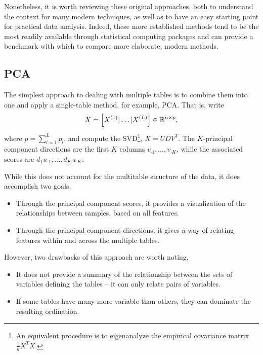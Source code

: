 \documentclass{article}
\begin{document}
Nonetheless, it is worth reviewing these original approaches, both to
understand the context for many modern techniques, as well as to have
an easy starting point for practical data analysis. Indeed, these more
established methods tend to be the most readily available through
statistical computing packages and can provide a benchmark with which
to compare more elaborate, modern methods.

\subsection{PCA}
\label{sec:pca}

The simplest approach to dealing with multiple tables is to combine
them into one and apply a single-table method, for example, PCA. That
is, write
\begin{align}
X = \left[X^{(1)} \vert \dots \vert X^{(L)}\right] \in \mathbb{R}^{n \times p},
\end{align}
where $p = \sum_{l = 1}^{L}p_{l}$, and compute the SVD\footnote{An
  equivalent procedure is to eigenanalyze the empirical covariance
  matrix $\frac{1}{n}X^{T}X$.}, $X = UDV^{T}$. The $K$-principal
component directions are the first $K$ columns $v_{\cdot 1}, \dots,
v_{\cdot K}$, while the associated scores are $d_{1}u_{\cdot 1},
\dots, d_{K}u_{\cdot K}$.

While this does not account for the multitable structure of the data,
it does accomplish two goals,
\begin{itemize}
\item Through the principal component scores, it provides a
  visualization of the relationships between
  samples, based on all features.
\item Through the principal component directions, it gives a way of
  relating features within and across the multiple tables.
\end{itemize}

However, two drawbacks of this approach are worth noting,
\begin{itemize}
  \item It does not provide a summary of the relationship between the
    sets of variables defining the tables -- it can only relate pairs
    of variables. \label{bullet:pca_drawback_one}
  \item If some tables have many more variable than others, they can
    dominate the resulting ordination. \label{bullet:pca_drawback_two}
\end{itemize}
\end{document}
